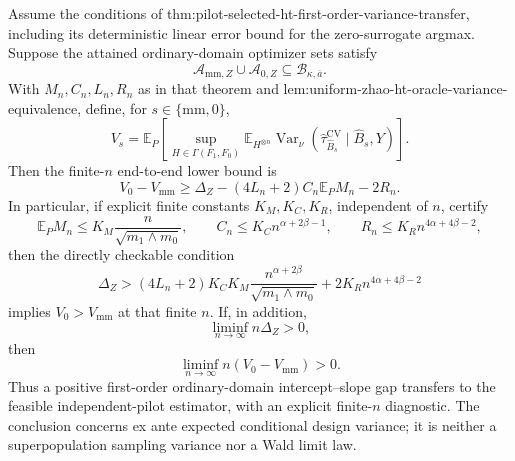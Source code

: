 Assume the conditions of thm:pilot-selected-ht-first-order-variance-transfer, including its deterministic linear error bound for the zero-surrogate argmax.  Suppose the attained ordinary-domain optimizer sets satisfy
\[
\mathcal A_{\mathrm{mm},Z}\cup\mathcal A_{0,Z}
\subseteq\mathcal B_{\kappa,\overline a}.
\]
With \(M_n,C_n,L_n,R_n\) as in that theorem and lem:uniform-zhao-ht-oracle-variance-equivalence, define, for \(s\in\{\mathrm{mm},0\}\),
\[
V_s=
\mathbb E_P\left[
\sup_{H\in\Gamma(F_1,F_0)}
\mathbb E_{H^{\otimes n}}
\operatorname{Var}_\nu
(\widehat\tau_{\widehat B_s}^{\mathrm{CV}}\mid\widehat B_s,Y)
\right].
\]
Then the finite-\(n\) end-to-end lower bound is
\[
V_0-V_{\mathrm{mm}}
\ge
\Delta_Z-(4L_n+2)C_n\mathbb E_PM_n-2R_n.
\]
In particular, if explicit finite constants \(K_M,K_C,K_R\), independent of \(n\), certify
\[
\mathbb E_PM_n\le K_M\frac{n}{\sqrt{m_1\wedge m_0}},
\qquad
C_n\le K_Cn^{\alpha+2\beta-1},
\qquad
R_n\le K_Rn^{4\alpha+4\beta-2},
\]
then the directly checkable condition
\[
\Delta_Z>
(4L_n+2)K_CK_M
\frac{n^{\alpha+2\beta}}{\sqrt{m_1\wedge m_0}}
+2K_Rn^{4\alpha+4\beta-2}
\]
implies \(V_0>V_{\mathrm{mm}}\) at that finite \(n\).  If, in addition,
\[
\liminf_{n\to\infty}n\Delta_Z>0,
\]
then
\[
\liminf_{n\to\infty}n(V_0-V_{\mathrm{mm}})>0.
\]
Thus a positive first-order ordinary-domain intercept--slope gap transfers to the feasible independent-pilot estimator, with an explicit finite-\(n\) diagnostic.  The conclusion concerns ex ante expected conditional design variance; it is neither a superpopulation sampling variance nor a Wald limit law.